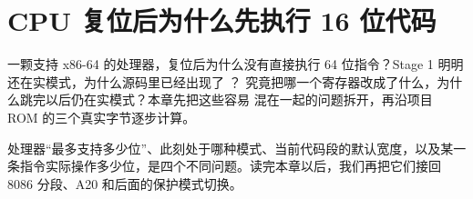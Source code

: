 \chapter{CPU 复位后为什么先执行 16 位代码}

一颗支持 x86-64 的处理器，复位后为什么没有直接执行 64 位指令？Stage 1
明明还在实模式，为什么源码里已经出现了 ？
究竟把哪一个寄存器改成了什么，为什么跳完以后仍在实模式？本章先把这些容易
混在一起的问题拆开，再沿项目 ROM 的三个真实字节逐步计算。

处理器“最多支持多少位”、此刻处于哪种模式、当前代码段的默认宽度，以及某一
条指令实际操作多少位，是四个不同问题。读完本章以后，我们再把它们接回
8086 分段、A20 和后面的保护模式切换。







